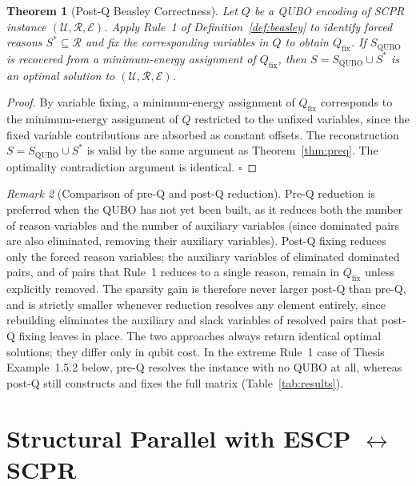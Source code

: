 \documentclass[11pt,a4paper]{article}
\theoremstyle{plain}
\newtheorem{theorem}{Theorem}[section]
\theoremstyle{definition}
\theoremstyle{remark}
\newtheorem{remark}[theorem]{Remark}
\newcommand{\U}{\mathcal{U}}
\newcommand{\R}{\mathcal{R}}
\newcommand{\E}{\mathcal{E}}
\newcommand{\Sstar}{S^{*}}
\newcommand{\SCPR}{\textup{SCPR}}
\newcommand{\QUBO}{\textup{QUBO}}
\begin{document}
\begin{theorem}[Post-Q Beasley Correctness]
\label{thm:postq}
Let $Q$ be a \QUBO{} encoding of \SCPR{} instance $(\U, \R, \E)$.
Apply Rule~1 of Definition~\ref{def:beasley} to identify forced reasons
$\Sstar \subseteq \R$ and fix the corresponding variables in $Q$ to obtain
$Q_{\text{fix}}$.
If $S_{\text{QUBO}}$ is recovered from a minimum-energy assignment of $Q_{\text{fix}}$,
then $S = S_{\text{QUBO}} \cup \Sstar$ is an optimal solution to $(\U, \R, \E)$.
\end{theorem}

\begin{proof}
By variable fixing, a minimum-energy assignment of $Q_{\text{fix}}$ corresponds
to the minimum-energy assignment of $Q$ restricted to the unfixed variables,
since the fixed variable contributions are absorbed as constant offsets.
The reconstruction $S = S_{\text{QUBO}} \cup \Sstar$ is valid by the same argument
as Theorem~\ref{thm:preq}.
The optimality contradiction argument is identical. \hfill $\square$
\end{proof}

\begin{remark}[Comparison of pre-Q and post-Q reduction]
Pre-Q reduction is preferred when the \QUBO{} has not yet been built, as it
reduces both the number of reason variables and the number of auxiliary variables
(since dominated pairs are also eliminated, removing their auxiliary variables).
Post-Q fixing reduces only the forced reason variables; the auxiliary variables
of eliminated dominated pairs, and of pairs that Rule~1 reduces to a single
reason, remain in $Q_{\text{fix}}$ unless explicitly removed.
The sparsity gain is therefore never larger post-Q than pre-Q, and is strictly
smaller whenever reduction resolves any element entirely, since rebuilding
eliminates the auxiliary and slack variables of resolved pairs that post-Q fixing
leaves in place.
The two approaches always return identical optimal solutions; they differ only in
qubit cost.
In the extreme Rule~1 case of Thesis Example~1.5.2 below, pre-Q resolves the
instance with no \QUBO{} at all, whereas post-Q still constructs and fixes the full
matrix (Table~\ref{tab:results}).
\end{remark}

\section{Structural Parallel with ESCP \texorpdfstring{$\leftrightarrow$}{<->} SCPR}
\label{sec:parallel}
\end{document}
